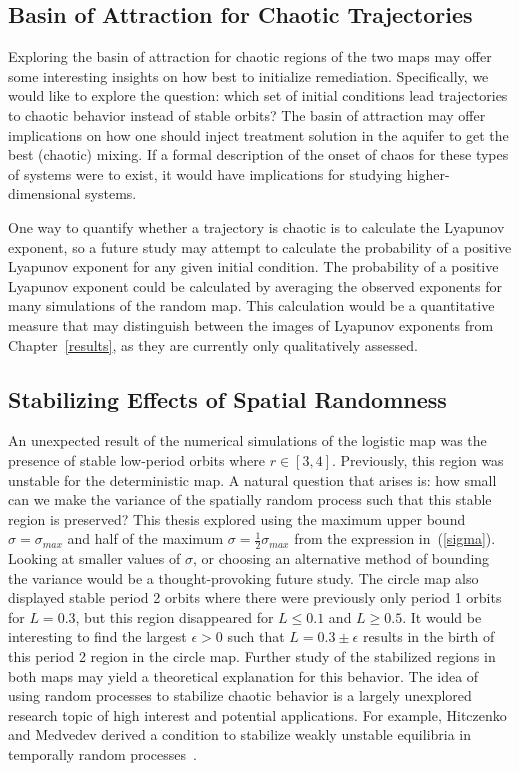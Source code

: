 \subsection{Basin of Attraction for Chaotic Trajectories}
Exploring the basin of attraction for chaotic
regions of the two maps may offer some interesting insights on how
best to initialize remediation. Specifically, we would like to explore the
question: which set of initial conditions lead trajectories to chaotic
behavior instead of stable orbits? The basin of attraction may offer
implications on how one should inject treatment solution in the
aquifer to get the best (chaotic) mixing. If a formal description of
the onset of chaos for these types of systems were to exist, it would
have implications for studying higher-dimensional systems.

One way to quantify whether a trajectory is chaotic is to calculate
the Lyapunov exponent, so a future study may attempt to calculate the
probability of a positive Lyapunov exponent for any given initial
condition. The probability of a positive Lyapunov exponent could be
calculated by averaging the observed exponents for many simulations of
the random map. This calculation would be a quantitative measure that
may distinguish between the images of Lyapunov exponents from
Chapter~\ref{results}, as they are currently only qualitatively assessed.
\subsection{Stabilizing Effects of Spatial Randomness}
An unexpected result of the numerical simulations of the logistic map
was the presence of stable low-period orbits where $r \in
[3,4]$. Previously, this region was unstable for the deterministic
map. A natural question that arises is: how small can we make the
variance of the spatially random process such that this stable region is
preserved? This thesis explored using the maximum upper bound $\sigma=\sigma_{max}$ and half
of the maximum $\sigma=\frac{1}{2}\sigma_{max}$ from the expression
in~(\ref{sigma}). Looking at smaller values of $\sigma$, or choosing
an alternative method of bounding the variance would be a thought-provoking future study. The circle map also displayed stable period 2 orbits where there
were previously only period 1 orbits for $L=0.3$, but this region
disappeared for $L\leq 0.1$ and $L \geq 0.5$. It would be interesting
to find the largest $\epsilon > 0$ such that $L=0.3 \pm \epsilon$
results in the birth of this period 2 region in the circle map. Further study of the stabilized
regions in both maps may yield a theoretical
explanation for this behavior. The idea of using random processes to
stabilize chaotic behavior is a largely unexplored research topic of
high interest and potential applications. For example, Hitczenko and Medvedev derived a condition to stabilize weakly
unstable equilibria in temporally random
processes~\cite{hitczenko}. 
